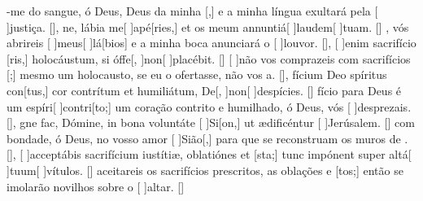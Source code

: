 {    {-me do sangue, ó Deus, Deus da minha [,] e a minha língua exultará pela [ ]{jus}{ti}ça. [\LinkPT]},
  {ne, lábia me[ ]{a}{pé}[ries,] et os meum annuntiá[ ]{lau}{dem}[ ]{tu}am. [\LinkLA]}%
    {, vós abrireis [ ]{meus}[ ]{lá}[bios] e a minha boca anunciará o [ ]{lou}{vor}. [\LinkPT]},
  {[ ]{e}nim sacrifício [ris,] holocáustum, si óffe[, ]{non}[ ]{pla}{cé}bit. [\LinkLA]}%
    {[ ]{não} vos comprazeis com sacrifícios [;] mesmo um holocausto, se eu o ofertasse, não vos a. [\LinkPT]},
  {fícium Deo spíritus con[tus,] cor contrítum et humiliátum, De[, ]{non}[ ]{de}{spíci}es. [\LinkLA]}%
    {fício para Deus é um espíri[ ]{con}{tri}[to;] um coração contrito e humilhado, ó Deus, vós [ ]{des}{pre}{zais}. [\LinkPT]},
  {gne fac, Dómine, in bona voluntáte [ ]{Si}[on,] ut ædificéntur [ ]{Je}{rúsa}lem. [\LinkLA]}%
    { com bondade, ó Deus, no vosso amor [ ]{Si}{ão}[,] para que se reconstruam os muros de . [\LinkPT]},
  {[ ]{ac}ceptábis sacrifícium iustítiæ, oblatiónes et [\-sta;] tunc impónent super altá[ ]{tu}{um}[ ]{vítu}\-los. [\LinkLA]}%
    { aceitareis os sacrifícios prescritos, as oblações e [tos;] então se imolarão novilhos sobre o [ ]{al}{tar}. [\LinkPT]}
}